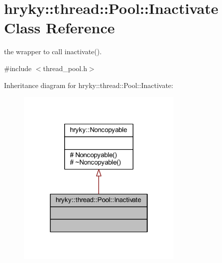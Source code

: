 \hypertarget{classhryky_1_1thread_1_1_pool_1_1_inactivate}{\section{hryky\-:\-:thread\-:\-:Pool\-:\-:Inactivate Class Reference}
\label{classhryky_1_1thread_1_1_pool_1_1_inactivate}
}


the wrapper to call inactivate().  




{\ttfamily \#include $<$thread\-\_\-pool.\-h$>$}



Inheritance diagram for hryky\-:\-:thread\-:\-:Pool\-:\-:Inactivate\-:\nopagebreak
\begin{figure}[H]
\begin{center}
\leavevmode
\includegraphics[width=226pt]{classhryky_1_1thread_1_1_pool_1_1_inactivate__inherit__graph}
\end{center}
\end{figure}
